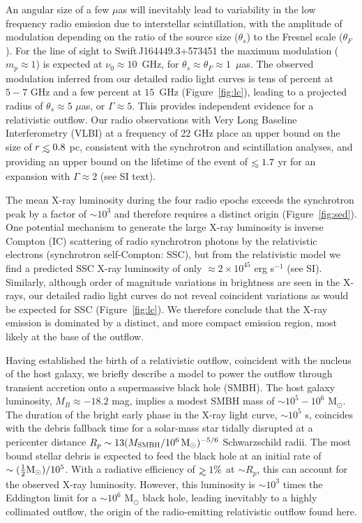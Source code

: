 An angular size of a few $\mu$as will inevitably lead to variability
in the low frequency radio emission due to interstellar scintillation,
with the amplitude of modulation depending\cite{gn06} on the ratio of
the source size ($\theta_s$) to the Fresnel scale ($\theta_F$).  For
the line of sight to Swift\,J164449.3+573451 the maximum modulation
($m_p\approx 1$) is expected\cite{cl02} at $\nu_0\approx 10$~GHz, for
$\theta_s\approx\theta_F\approx 1$~$\mu$as.  The observed modulation
inferred from our detailed radio light curves is tens of percent at
$5-7$ GHz and a few percent at $15$~GHz (Figure~\ref{fig:lc}), leading
to a projected radius of $\theta_s\approx 5$ $\mu$as, or $\Gamma
\approx 5$.  This provides independent evidence for a relativistic
outflow.  Our radio observations with Very Long Baseline
Interferometry (VLBI) at a frequency of 22 GHz place an upper bound on
the size of $r\simlt 0.8$ pc, consistent with the synchrotron and
scintillation analyses, and providing an upper bound on the lifetime
of the event of $\simlt 1.7$ yr for an expansion with $\Gamma\approx
2$ (see SI text).

The mean X-ray luminosity during the four radio epochs exceeds the
synchrotron peak by a factor of $\sim 10^3$ and therefore requires a
distinct origin (Figure~\ref{fig:sed}).  One potential mechanism to
generate the large X-ray luminosity is inverse Compton (IC) scattering
of radio synchrotron photons by the relativistic electrons
(synchrotron self-Compton: SSC), but from the relativistic model we
find a predicted SSC X-ray luminosity of only $\approx 2\times
10^{45}$ erg s$^{-1}$ (see SI).  Similarly, although order of
magnitude variations in brightness are seen in the X-rays, our
detailed radio light curves do not reveal coincident variations as
would be expected for SSC (Figure~\ref{fig:lc}).  We therefore
conclude that the X-ray emission is dominated by a distinct, and more
compact emission region, most likely at the base of the outflow.

Having established the birth of a relativistic outflow, coincident
with the nucleus of the host galaxy, we briefly describe a model to
power the outflow through transient accretion\cite{bgm+11} onto a
supermassive black hole (SMBH).  The host galaxy luminosity,
$M_B\approx -18.2$ mag, implies\cite{gh07} a modest SMBH mass of $\sim
10^5-10^6$ M$_\odot$.  The duration of the bright early phase in the
X-ray light curve, $\sim 10^5$ s, coincides with the debris fallback
time for a solar-mass star tidally disrupted at a pericenter distance
$R_p\sim 13 (M_{\rm SMBH}/10^6\,{\rm M}_\odot)^{-5/6}$ Schwarzschild
radii.  The most bound stellar debris is expected to feed the black
hole at an initial rate of\cite{sq09} $\sim (\frac{1}{2}{\rm
M_\odot})/10^5$.  With a radiative efficiency of $\simgt 1\%$ at $\sim
R_p$, this can account for the observed X-ray luminosity.  However,
this luminosity is $\sim 10^3$ times the Eddington limit for a $\sim
10^6$ M$_\odot$ black hole, leading inevitably to a highly collimated
outflow, the origin of the radio-emitting relativistic outflow found
here.

